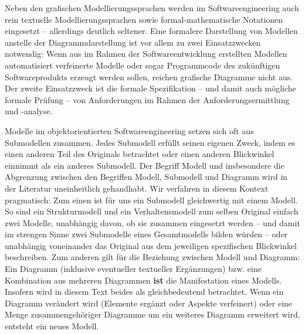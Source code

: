 Neben den grafischen Modellierungssprachen werden im Softwareengineering auch rein textuelle Modellierungssprachen sowie formal-mathematische Notationen eingesetzt – allerdings deutlich seltener. Eine formalere Darstellung von Modellen anstelle der Diagrammdarstellung ist vor allem zu zwei Einsatzzwecken notwendig: Wenn aus im Rahmen der Softwareentwicklung erstellten Modellen automatisiert verfeinerte Modelle oder sogar Programmcode des zukünftigen Softwareprodukts erzeugt werden sollen, reichen grafische Diagramme nicht aus. Der zweite Einsatzzweck ist die formale Spezifikation – und damit auch mögliche formale Prüfung – von Anforderungen im Rahmen der Anforderungsermittlung und -analyse. 

Modelle im objektorientierten Softwareengineering setzen sich oft aus Submodellen zusammen. Jedes Submodell erfüllt seinen eigenen Zweck, indem es einen anderen Teil des Originals betrachtet oder einen anderen Blickwinkel einnimmt als ein anderes Submodell. Der  Begriff Modell 
und insbesondere die Abgrenzung zwischen den Begriffen Modell, Submodell und Diagramm wird in der Literatur uneinheitlich gehandhabt. Wir verfahren in diesem Kontext pragmatisch: Zum einen ist für uns ein Submodell gleichwertig mit einem Modell. So sind ein Strukturmodell und ein Verhaltensmodell zum selben Original einfach zwei Modelle, unabhängig davon, ob sie zusammen eingesetzt werden – und damit im strengen Sinne zwei Submodelle eines Gesamtmodells bilden würden – oder unabhängig voneinander das Original aus dem jeweiligen spezifischen Blickwinkel beschreiben.  Zum anderen gilt für die Beziehung zwischen Modell und Diagramm: Ein Diagramm (inklusive eventueller textueller Ergänzungen) bzw. eine Kombination aus mehreren Diagrammen \textbf{ist} die Manifestation eines Modells. Insofern wird in diesem Text beides als gleichbedeutend betrachtet. Wenn ein Diagramm verändert wird (\zb Elemente ergänzt oder Aspekte verfeinert) oder eine Menge zusammengehöriger Diagramme um ein weiteres Diagramm erweitert wird, entsteht ein neues Modell. 
